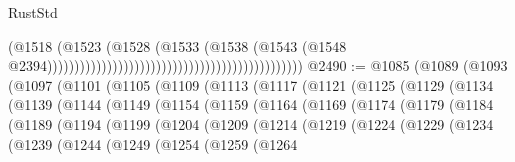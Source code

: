 \begin{lexlean}{RustStd}
\begin{coremodule}
{\begin{coremodule}
{{{{{{{{{{{{{{{{{{{{{{{{{{{{{{{{{{{{{{{{{{{{{{{{{{{{{{{{{{{{                                                                                    (@1518
                                                                                      (@1523
                                                                                        (@1528
                                                                                          (@1533
                                                                                            (@1538
                                                                                              (@1543
                                                                                                (@1548
                                                                                                  @2394)))))))))))))))))))))))))))))))))))))))))))))))
@2490 := @1085
    (@1089
      (@1093
        (@1097
          (@1101
            (@1105
              (@1109
                (@1113
                  (@1117
                    (@1121
                      (@1125
                        (@1129
                          (@1134
                            (@1139
                              (@1144
                                (@1149
                                  (@1154
                                    (@1159
                                      (@1164
                                        (@1169
                                          (@1174
                                            (@1179
                                              (@1184
                                                (@1189
                                                  (@1194
                                                    (@1199
                                                      (@1204
                                                        (@1209
                                                          (@1214
                                                            (@1219
                                                              (@1224
                                                                (@1229
                                                                  (@1234
                                                                    (@1239
                                                                      (@1244
                                                                        (@1249
                                                                          (@1254
                                                                            (@1259
                                                                              (@1264
}}}}}}}}}}}}}}}}}}}}}}}}}}}}}}}}}}}}}}}}}}}}}}}}}}}}}}}}}}}}
\end{coremodule}}
\end{coremodule}
\end{lexlean}
